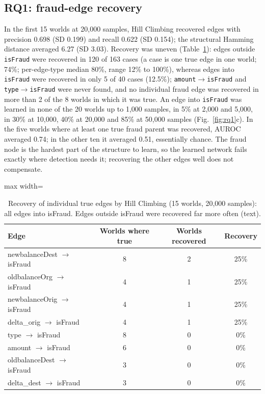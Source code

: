\documentclass[final,5p,times,authoryear]{elsarticle}
\begin{document}
\subsection{RQ1: fraud-edge recovery}\label{sec:edges}
In the first 15 worlds at 20,000 samples, Hill Climbing recovered edges with precision 0.698 (SD 0.199) and recall 0.622 (SD 0.154); the structural Hamming distance averaged 6.27 (SD 3.03). Recovery was uneven (Table~\ref{tab:edges}): edges outside \texttt{isFraud} were recovered in 120 of 163 cases (a case is one true edge in one world; 74\%; per-edge-type median 80\%, range 12\% to 100\%), whereas edges into \texttt{isFraud} were recovered in only 5 of 40 cases (12.5\%); \texttt{amount}$\to$\texttt{isFraud} and \texttt{type}$\to$\texttt{isFraud} were never found, and no individual fraud edge was recovered in more than 2 of the 8 worlds in which it was true. An edge into \texttt{isFraud} was learned in none of the 20 worlds up to 1,000 samples, in 5\% at 2,000 and 5,000, in 30\% at 10,000, 40\% at 20,000 and 85\% at 50,000 samples (Fig.~\ref{fig:rq1}c). In the five worlds where at least one true fraud parent was recovered, AUROC averaged 0.74; in the other ten it averaged 0.51, essentially chance. The fraud node is the hardest part of the structure to learn, so the learned network fails exactly where detection needs it; recovering the other edges well does not compensate.

\begin{table}[H]
\centering\small
\begin{adjustbox}{max width=\linewidth}
\begin{tabular}{lccc}\toprule
Edge & Worlds where true & Worlds recovered & Recovery\\\midrule
newbalanceDest $\to$ isFraud & 8 & 2 & 25\%\\
oldbalanceOrg $\to$ isFraud & 4 & 1 & 25\%\\
newbalanceOrig $\to$ isFraud & 4 & 1 & 25\%\\
delta\_orig $\to$ isFraud & 4 & 1 & 25\%\\
type $\to$ isFraud & 8 & 0 & 0\%\\
amount $\to$ isFraud & 6 & 0 & 0\%\\
oldbalanceDest $\to$ isFraud & 3 & 0 & 0\%\\
delta\_dest $\to$ isFraud & 3 & 0 & 0\%\\\bottomrule
\end{tabular}
\end{adjustbox}
\caption{Recovery of individual true edges by Hill Climbing (15 worlds, 20,000 samples): all edges into isFraud. Edges outside isFraud were recovered far more often (text).}\label{tab:edges}
\end{table}
\end{document}
